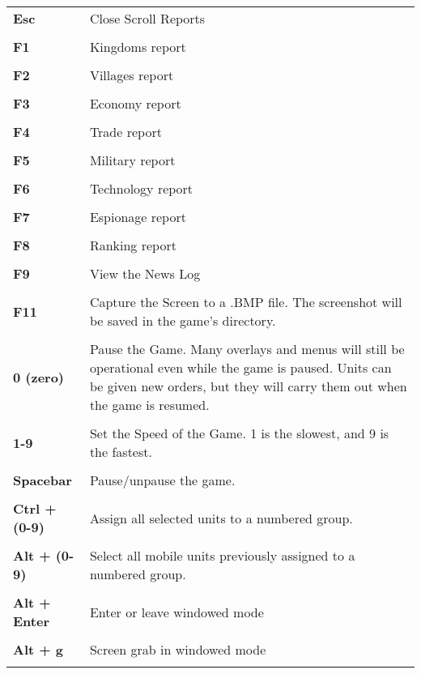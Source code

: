 \begin{tabular}{p{1in} p{3in}}
    \textbf{Esc} & Close Scroll Reports \\ \\
    \textbf{F1} & Kingdoms report \\ \\
    \textbf{F2} & Villages report \\ \\
    \textbf{F3} & Economy report \\ \\
    \textbf{F4} & Trade report \\\\
    \textbf{F5} & Military report \\ \\ 
    \textbf{F6} & Technology report \\ \\
    \textbf{F7} & Espionage report \\ \\
    \textbf{F8} & Ranking report \\ \\
    \textbf{F9} & View the News Log \\ \\
    \textbf{F11} & Capture the Screen to a .BMP file. The screenshot will be saved in the game’s directory. \\ \\


    \textbf{0 (zero)} & Pause the Game. Many overlays and menus will still be operational even while the game is paused. Units can be given new orders, but they will carry them out when the game is resumed.\\ \\
    \textbf{1-9} & Set the Speed of the Game. 1 is the slowest, and 9 is the fastest. \\ \\    
    \textbf{Spacebar} & Pause/unpause the game.\\ \\    
    \textbf{Ctrl + (0-9)} & Assign all selected units to a numbered group.\\ \\
    \textbf{Alt + (0-9)} & Select all mobile units previously assigned to a numbered group.\\ \\
    \textbf{Alt + Enter} & Enter or leave windowed mode\\ \\
    \textbf{Alt + g} & Screen grab in windowed mode\\ \\
\end{tabular}


